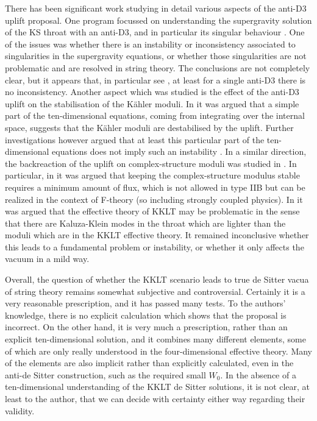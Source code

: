 \documentclass[11pt,a4paper]{article}
\numberwithin{equation}{section}
\numberwithin{table}{section}\setlength{\multlinegap}{25pt}
\begin{document}
{There has been significant work studying in detail various aspects of the anti-D3 uplift proposal. One program focussed on understanding the supergravity solution of the KS throat with an anti-D3, and in particular its singular behaviour \cite{Bena:2009xk,Bena:2012ek,Bena:2014bxa,Bena:2015kia,Bena:2016fqp,Blaback:2012nf,Gautason:2013zw,Danielsson:2014yga,Michel:2014lva,Danielsson:2016cit,Cohen-Maldonado:2015ssa,Cohen-Maldonado:2016cjh}. One of the issues was whether there is an instability or inconsistency associated to singularities in the supergravity equations, or whether those singularities are not problematic and are resolved in string theory. The conclusions are not completely clear, but it appears that, in particular see \cite{Michel:2014lva}, at least for a single anti-D3 there is no inconsistency. Another aspect which was studied is the effect of the anti-D3 uplift on the stabilisation of the K{\"a}hler moduli. In \cite{Moritz:2017xto} it was argued that a simple part of the ten-dimensional equations, coming from integrating over the internal space, suggests that the K{\"a}hler moduli are destabilised by the uplift. Further investigations however argued that at least this particular part of the ten-dimensional equations does not imply such an instability \cite{Hamada:2018qef,Kallosh:2019axr,Kallosh:2019oxv,Hamada:2019ack,Gautason:2019jwq,Carta:2019rhx}. In a similar direction, the backreaction of the uplift on complex-structure moduli was studied in \cite{Blumenhagen:2016bfp,Wolf:2017wmu,Bena:2018fqc,Blumenhagen:2019qcg}. In particular, in \cite{Bena:2018fqc} it was argued that keeping the complex-structure modulus stable requires a minimum amount of flux, which is not allowed in type IIB but can be realized in the context of F-theory (so including strongly coupled physics). In \cite{Blumenhagen:2019qcg} it was argued that the effective theory of KKLT may be problematic in the sense that there are Kaluza-Klein modes in the throat which are lighter than the moduli which are in the KKLT effective theory. It remained inconclusive whether this leads to a fundamental problem or instability, or whether it only affects the vacuum in a mild way. 

Overall, the question of whether the KKLT scenario leads to true de Sitter vacua of string theory remains somewhat subjective and controversial. Certainly it is a very reasonable prescription, and it has passed many tests. To the authors' knowledge, there is no explicit calculation which shows that the proposal is incorrect. On the other hand, it is very much a prescription, rather than an explicit ten-dimensional solution, and it combines many different elements, some of which are only really understood in the four-dimensional effective theory. Many of the elements are also implicit rather than explicitly calculated, even in the anti-de Sitter construction, such as the required small $W_0$. In the absence of a ten-dimensional understanding of the KKLT de Sitter solutions, it is not clear, at least to the author, that we can decide with certainty either way regarding their validity.

}
\end{document}
